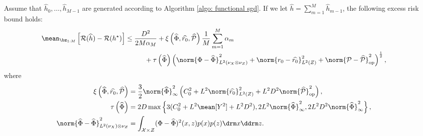 \begin{theorem}
    Assume that $ \hat{ h }_{ 0 }, \dots, \hat{ h }_{ M-1 } $ are generated according to Algorithm \ref{algo: functional sgd}.
    If we let $ \hat{ h } = \sum_{ m=1 }^{ M } \hat{ h }_{ m-1 } $, the following excess risk bound holds:
    \begin{align*}
        \begin{split}
            \mean_{ \bz_{ 1:M } } \left[
                \risk ( \hat{ h } ) - \risk ( \hstar )
            \right]
            &\leq \frac{ D^2 }{ 2 M \alpha_{ M } }
            + \xi \left( \hat{ \Phi }, \hat{ r_{ 0 } }, \hat{ \meanop } \right) \frac{ 1 }{ M } \sum_{ m=1 }^{ M } \alpha_{ m } \\
            &\hspace{1cm}
            + \tau \left( \hat{ \Phi } \right) \left(
                \norm{ \Phi - \hat{ \Phi } }_{ L^{ 2 } ( \nu_{ X } \otimes \nu_{ Z } ) }^2 + \norm{ r_{ 0 } - \hat{ r_{ 0 } } }_{ L^2 ( Z ) }^2 + \norm{ \meanop - \hat{ \meanop } }_{ \op }^2
            \right)^{ \frac{ 1 }{ 2 } },
        \end{split}
    \end{align*}
    where
    \begin{align*}
        \xi \left( \hat{ \Phi }, \hat{ r_{ 0 } }, \hat{ \meanop } \right)
        &= \frac{ 3 }{ 2 } \norm{ \hat{ \Phi } }_{ \infty }^2 \left(
            C_{ 0 }^2 + L^2 \norm{ \hat{ r_{ 0 } } }_{ L^2 ( Z ) }^2 + L^2 D ^2 \norm{ \hat{ \meanop } }_{ \op }^2
        \right), \\
        \tau \left( \hat{ \Phi } \right)
        &= 2 D \max \left\{
            3 ( C_{ 0 }^2 + L^2 \mean [ Y^2 ] + L^2 D^2 ),
            2L^2 \norm{ \hat{ \Phi } }_{ \infty }^2,
            2L^2 D^2 \norm{ \hat{ \Phi } }_{ \infty }^2
        \right\}, \\
        \norm{ \hat{ \Phi } - \hat{ \Phi } }_{ L^2 ( \nu_{ X } ) \otimes \nu_{ Z } }^2
        &= \int_{ \mathcal{X} \times \mathcal{Z} } ( \Phi - \hat{ \Phi } )^2 ( x, z ) p ( x ) p ( z ) \drm x \ddrm z
    .\end{align*}
\end{theorem}
